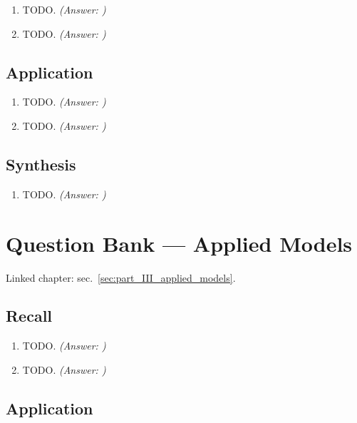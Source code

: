 \documentclass[
]{article}
\theoremstyle{plain}
\theoremstyle{definition}
\begin{document}
\begin{enumerate}
\def\labelenumi{\arabic{enumi}.}
\item
  TODO. \emph{(Answer: )}
\item
  TODO. \emph{(Answer: )}
\end{enumerate}

\subsection{Application}\label{application-8}

\begin{enumerate}
\def\labelenumi{\arabic{enumi}.}
\setcounter{enumi}{2}
\item
  TODO. \emph{(Answer: )}
\item
  TODO. \emph{(Answer: )}
\end{enumerate}

\subsection{Synthesis}\label{synthesis-8}

\begin{enumerate}
\def\labelenumi{\arabic{enumi}.}
\setcounter{enumi}{4}
\item
  TODO. \emph{(Answer: )}
\end{enumerate}

\newpage

\section{Question Bank --- Applied
Models}\label{sec:q_part_III_applied_models}

Linked chapter: sec.~\ref{sec:part_III_applied_models}.

\subsection{Recall}\label{recall-9}

\begin{enumerate}
\def\labelenumi{\arabic{enumi}.}
\item
  TODO. \emph{(Answer: )}
\item
  TODO. \emph{(Answer: )}
\end{enumerate}

\subsection{Application}\label{application-9}
\end{document}
